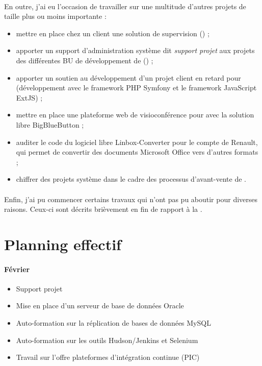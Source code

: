\paragraph{}
En outre, j'ai eu l'occasion de travailler sur une multitude d'autres projets de taille plus ou moins importante :

\begin{itemize}
	\item mettre en place chez un client une solution de supervision \acentreon{} () ;
	\item apporter un support d'administration système dit \emph{support projet} aux projets des différentes BU de développement de \asmile{} () ;
	\item apporter un soutien au développement d'un projet client en retard pour \abt{} (développement avec le framework PHP Symfony et le framework JavaScript ExtJS) ;
	\item mettre en place une plateforme web de visioconférence pour \asmile{} avec la solution libre BigBlueButton ;
	\item auditer le code du logiciel libre Linbox-Converter pour le compte de Renault, qui permet de convertir des documents Microsoft Office vers d'autres formats ;
	\item chiffrer des projets système dans le cadre des processus d'avant-vente de \asmile.
\end{itemize}

\paragraph{}
Enfin, j'ai pu commencer certains travaux qui n'ont pas pu aboutir pour diverses raisons.
Ceux-ci sont décrits brièvement en fin de rapport à la .



\section{Planning effectif}

\paragraph{Février}
\begin{itemize}
	\item Support projet
	\item Mise en place d'un serveur de base de données Oracle
	\item Auto-formation sur la réplication de bases de données MySQL
	\item Auto-formation sur les outils Hudson/Jenkins et Selenium
	\item Travail sur l'offre \og plateformes d'intégration continue \fg{} (PIC)
\end{itemize}

